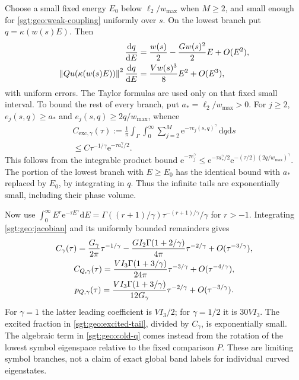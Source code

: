 \documentclass[aps,pra,reprint,superscriptaddress,longbibliography]{revtex4-2}
\newcommand{\dd}{\mathrm d}
\newcommand{\ee}{\mathrm e}
\newcommand{\norm}[1]{\left\lVert#1\right\rVert}
\begin{document}
Choose a small fixed energy $E_0$ below $\ell_2/w_{\max}$ when $M\geq2$,
and small enough for \eqref{sgt:geo:weak-coupling} uniformly over $s$.
On the lowest branch put $q=\kappa(w(s)E)$.  Then
\begin{align}
 \frac{\dd q}{\dd E}
 &=\frac{w(s)}2-\frac{Gw(s)^2}2E+O(E^2),\notag\\
 \norm{Qu(\kappa(w(s)E))}^2\frac{\dd q}{\dd E}
 &=\frac{Vw(s)^3}{8}E^2+O(E^3),
 \label{sgt:geo:jacobian}
\end{align}
with uniform errors.  The Taylor formulas are used only on that fixed
small interval.  To bound the rest of every branch, put
$a_*=\ell_2/w_{\max}>0$.  For $j\geq2$,
$e_j(s,q)\geq a_*$ and $e_j(s,q)\geq2q/w_{\max}$, whence
\begin{equation}
\begin{gathered}
 C_{\mathrm{exc},\gamma}(\tau):=
 \frac1\pi\int_\Gamma\int_0^\infty
       \sum_{j=2}^M\ee^{-\tau e_j(s,q)^\gamma}\,\dd q\dd s
\\
 \leq C\tau^{-1/\gamma}\ee^{-\tau a_*^\gamma/2}.
 \label{sgt:geo:excited-tail}
\end{gathered}
\end{equation}
This follows from the integrable product bound
$\ee^{-\tau e_j^\gamma}
\leq\ee^{-\tau a_*^\gamma/2}
\ee^{-(\tau/2)(2q/w_{\max})^\gamma}$.
The portion of the lowest branch with $E\geq E_0$ has the identical
bound with $a_*$ replaced by $E_0$, by integrating in $q$.
Thus the infinite tails are exponentially small, including their
phase volume.

Now use
$\int_0^\infty E^r\ee^{-\tau E^\gamma}\dd E
=\Gamma((r+1)/\gamma)\tau^{-(r+1)/\gamma}/\gamma$ for $r>-1$.
Integrating \eqref{sgt:geo:jacobian} and its uniformly bounded
remainders gives
\begin{gather}
 C_\gamma(\tau)
 =\frac{G_\gamma}{2\pi}\tau^{-1/\gamma}
 -\frac{GI_2\Gamma(1+2/\gamma)}{4\pi}\tau^{-2/\gamma}
 +O(\tau^{-3/\gamma}),
 \label{sgt:geo:cold-partition}\\
 C_{Q,\gamma}(\tau)
 =\frac{VI_3\Gamma(1+3/\gamma)}{24\pi}\tau^{-3/\gamma}
 +O(\tau^{-4/\gamma}),\notag\\
 p_{Q,\gamma}(\tau)
 =\frac{VI_3\Gamma(1+3/\gamma)}{12G_\gamma}
                       \tau^{-2/\gamma}
 +O(\tau^{-3/\gamma}).
 \label{sgt:geo:cold-q}
\end{gather}
For $\gamma=1$ the latter leading coefficient is $VI_3/2$;
for $\gamma=1/2$ it is $30VI_3$.  The excited fraction in
\eqref{sgt:geo:excited-tail}, divided by $C_\gamma$, is exponentially
small.  The algebraic term in \eqref{sgt:geo:cold-q} comes instead
from the rotation of the lowest symbol eigenspace relative to the
fixed comparison $P$.  These are limiting symbol branches, not a
claim of exact global band labels for individual curved eigenstates.
\end{document}
